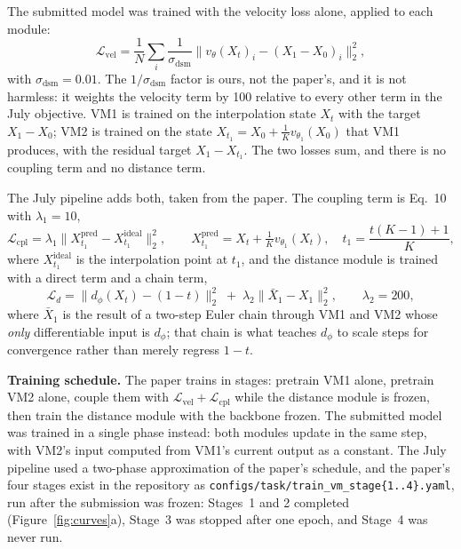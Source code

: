 \documentclass{article}
\begin{document}
The submitted model was trained with the velocity loss alone, applied to each module:
\begin{equation}
\mathcal{L}_{\text{vel}} = \frac{1}{N}\sum_{i}\frac{1}{\sigma_{\text{dsm}}}\big\|v_\theta(X_t)_i - (X_1 - X_0)_i\big\|_2^2 ,
\end{equation}
with $\sigma_{\text{dsm}} = 0.01$. The $1/\sigma_{\text{dsm}}$ factor is ours, not the paper's, and it is not harmless: it weights the velocity term by 100 relative to every other term in the July objective. VM1 is trained on the interpolation state $X_t$ with the target $X_1 - X_0$; VM2 is trained on the state $X_{t_1} = X_0 + \frac{1}{K} v_{\theta_1}(X_0)$ that VM1 produces, with the residual target $X_1 - X_{t_1}$. The two losses sum, and there is no coupling term and no distance term.

The July pipeline adds both, taken from the paper. The coupling term is Eq.~10 with $\lambda_1 = 10$,
\begin{equation}
\mathcal{L}_{\text{cpl}} = \lambda_1 \big\| X_{t_1}^{\text{pred}} - X_{t_1}^{\text{ideal}} \big\|_2^2 ,
\qquad
X_{t_1}^{\text{pred}} = X_t + \tfrac{1}{K} v_{\theta_1}(X_t),\quad
t_1 = \frac{t(K-1)+1}{K},
\end{equation}
where $X_{t_1}^{\text{ideal}}$ is the interpolation point at $t_1$, and the distance module is trained with a direct term and a chain term,
\begin{equation}
\mathcal{L}_{d} = \big\|d_\phi(X_t) - (1-t)\big\|_2^2 \;+\; \lambda_2 \big\|\bar{X}_1 - X_1\big\|_2^2 ,
\qquad \lambda_2 = 200,
\end{equation}
where $\bar{X}_1$ is the result of a two-step Euler chain through VM1 and VM2 whose \emph{only} differentiable input is $d_\phi$; that chain is what teaches $d_\phi$ to scale steps for convergence rather than merely regress $1-t$.

\textbf{Training schedule.} The paper trains in stages: pretrain VM1 alone, pretrain VM2 alone, couple them with $\mathcal{L}_{\text{vel}} + \mathcal{L}_{\text{cpl}}$ while the distance module is frozen, then train the distance module with the backbone frozen. The submitted model was trained in a single phase instead: both modules update in the same step, with VM2's input computed from VM1's current output as a constant. The July pipeline used a two-phase approximation of the paper's schedule, and the paper's four stages exist in the repository as \texttt{configs/task/train\_vm\_stage\{1..4\}.yaml}, run after the submission was frozen: Stages~1 and 2 completed (Figure~\ref{fig:curves}a), Stage~3 was stopped after one epoch, and Stage~4 was never run.
\end{document}
